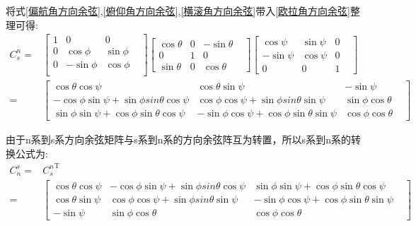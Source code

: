 \documentclass[12pt,a4paper]{article}
\renewcommand{\citep}[1]{\textsuperscript{\cite{#1}}}
\begin{document}
将式\ref{偏航角方向余弦},\ref{俯仰角方向余弦},\ref{横滚角方向余弦}带入\ref{欧拉角方向余弦}整理可得:
\begin{equation}\label{欧拉角n转s}
    \begin{split} 
        C^n_s=&\left[\begin{matrix}
                1 &           0 &          0 & \\
                0 &  \cos{\phi} & \sin{\phi} & \\
                0 & -\sin{\phi} & \cos{\phi} & \\
                \end{matrix}\right]
                \left[\begin{matrix}
                \cos{\theta} & 0 & -\sin{\theta} & \\
                           0 & 1 &           0 & \\
                \sin{\theta} & 0 &  \cos{\theta} &
                \end{matrix}\right]
                \left[\begin{matrix}
                 \cos{\psi} & \sin{\psi} & 0 & \\
                -\sin{\psi} & \cos{\psi} & 0 & \\
                          0 &          0 & 1 &
                \end{matrix}\right] \\
                =&\left[\begin{matrix}
                \cos{\theta}\cos{\psi} & \cos{\theta}\sin{\psi} & -\sin{\psi} & \\
                -\cos{\phi}\sin{\psi}+\sin{\phi}sin{\theta}\cos{\psi} & \cos{\phi}\cos{\psi}+\sin{\phi}sin{\theta}\sin{\psi} & \sin{\phi}\cos{\theta} & \\
                 \sin{\phi}\sin{\psi} + \cos{\phi}\sin{\theta}\cos{\psi} & -\sin{\phi}\cos{\psi} + \cos{\phi}\sin{\theta}\sin{\psi} & \cos{\phi}\cos{\theta} &
                \end{matrix}\right]
    \end{split}
\end{equation} 

由于n系到s系方向余弦矩阵与s系到n系的方向余弦阵互为转置\citep{方向余弦阵}，所以s系到n系的转换公式为:
\begin{equation}\label{欧拉角s转n}
    \begin{split} 
        C^s_n=&{C^n_s}^\mathrm{T} \\
             =&\left[\begin{matrix}
                \cos{\theta}\cos{\psi} & -\cos{\phi}\sin{\psi}+\sin{\phi}sin{\theta}\cos{\psi} &  \sin{\phi}\sin{\psi} + \cos{\phi}\sin{\theta}\cos{\psi} & \\
                \cos{\theta}\sin{\psi} &  \cos{\phi}\cos{\psi}+\sin{\phi}sin{\theta}\sin{\psi} & -\sin{\phi}\cos{\psi} + \cos{\phi}\sin{\theta}\sin{\psi} & \\
                -\sin{\psi} & \sin{\phi}\cos{\theta} & \cos{\phi}\cos{\theta} &
                \end{matrix}\right]
    \end{split}
\end{equation} 
\end{document}
